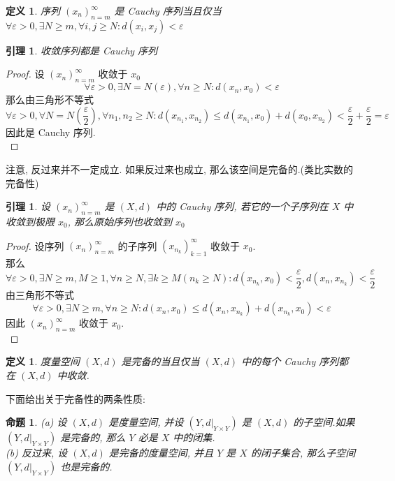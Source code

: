 \documentclass[12pt, a4paper, oneside]{ctexart}
\newtheorem{definition}[theorem]{定义}
\newtheorem{lemma}[theorem]{引理}
\newtheorem{proposition}[theorem]{命题}
\begin{document}
\begin{definition}
    序列 $(x_n)_{n=m}^{\infty}$ 是 Cauchy 序列当且仅当 $\forall \varepsilon > 0, \exists N \geq m, \forall i,j\geq N:d(x_i,x_j)<\varepsilon$
\end{definition}
\begin{lemma}
    收敛序列都是 Cauchy 序列
\end{lemma}
\begin{proof}
    设 $(x_n)_{n=m}^{\infty}$ 收敛于 $x_0$
    $$
        \forall \varepsilon > 0, \exists N=N(\varepsilon), \forall n\geq N:d(x_n, x_0) <\varepsilon
    $$
    那么由三角形不等式
    $$
        \forall \varepsilon > 0, \forall N=N(\frac{\varepsilon}{2}), \forall n_1, n_2\geq N:d(x_{n_1}, x_{n_2})\leq d(x_{n_1}, x_0) + d(x_0, x_{n_2})< \frac{\varepsilon}{2}+\frac{\varepsilon}{2}=\varepsilon
    $$
    因此是 Cauchy 序列.\\
\end{proof}

注意, 反过来并不一定成立. 如果反过来也成立, 那么该空间是完备的.(类比实数的完备性)

\begin{lemma}
    设 $(x_n)_{n=m}^{\infty}$ 是 $(X, d)$ 中的 Cauchy 序列, 若它的一个子序列在 $X$ 中收敛到极限 $x_0$, 那么原始序列也收敛到 $x_0$ 
\end{lemma}

\begin{proof}
    设序列 $(x_n)_{n=m}^{\infty}$ 的子序列 $(x_{n_k})_{k=1}^{\infty}$ 收敛于 $x_0$.\\
    那么
    $$
        \forall \varepsilon > 0, \exists N \geq m, M \geq 1, \forall n\geq N,\exists k\geq M (n_k\geq N):d(x_{n_k},x_0)<\frac{\varepsilon}{2}, d(x_n,x_{n_k})<\frac{\varepsilon}{2}
    $$
    由三角形不等式
    $$
        \forall \varepsilon > 0, \exists N \geq m, \forall n\geq N: d(x_n, x_0) \leq d(x_n, x_{n_k}) + d(x_{n_k}, x_0) < \varepsilon
    $$
    因此 $(x_n)_{n=m}^{\infty}$ 收敛于 $x_0$.\\
\end{proof}

\begin{definition}
    度量空间 $(X,d)$ 是完备的当且仅当 $(X,d)$ 中的每个 Cauchy 序列都在 $(X,d)$ 中收敛.
\end{definition}

下面给出关于完备性的两条性质:

\begin{proposition}
    (a) 设 $(X, d)$ 是度量空间, 并设 $(Y, d|_{Y\times Y})$ 是 $(X,d)$ 的子空间.如果 $(Y, d|_{Y\times Y})$ 是完备的, 那么 $Y$ 必是 $X$ 中的闭集.\\
    (b) 反过来, 设 $(X, d)$ 是完备的度量空间, 并且 $Y$ 是 $X$ 的闭子集合, 那么子空间 $(Y, d|_{Y\times Y})$ 也是完备的.
\end{proposition}
\end{document}
